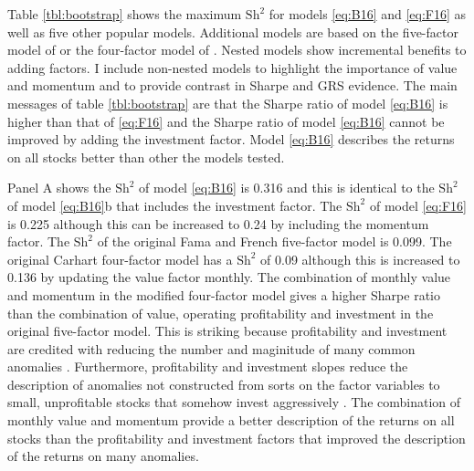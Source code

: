 

Table \ref{tbl:bootstrap} shows the maximum $\text{Sh}^2$ for models
\ref{eq:B16} and \ref{eq:F16} as well as five other popular models.
Additional models are based on the five-factor model of \textcite{fama2015five}
or the four-factor model of \textcite{carhart1997persistence}.
Nested models show incremental benefits to adding factors.
I include non-nested models to highlight the importance of value and momentum
and to provide contrast in Sharpe and GRS evidence.
The main messages of table \ref{tbl:bootstrap} are that the Sharpe ratio of
model \ref{eq:B16} is higher than that of \ref{eq:F16} and the Sharpe ratio of
model \ref{eq:B16} cannot be improved by adding the investment factor.
Model \ref{eq:B16} describes the returns on all stocks better than other the
models tested.

Panel A shows the $\text{Sh}^2$ of model \ref{eq:B16} is 0.316 and this
is identical to the $\text{Sh}^2$ of model \ref{eq:B16}b that includes
the investment factor.
The $\text{Sh}^2$ of model \ref{eq:F16} is 0.225 although this can be
increased to 0.24 by including the momentum factor.
The $\text{Sh}^2$ of the original Fama and French five-factor model is 0.099.
The original Carhart four-factor model has a $\text{Sh}^2$ of 0.09 although
this is increased to 0.136 by updating the value factor monthly.
The combination of monthly value and momentum in the modified four-factor
model gives a higher Sharpe ratio than the combination of value, operating
profitability and investment in the original five-factor model.
This is striking because profitability and investment are credited with
reducing the number and maginitude of many common anomalies
\parencite{fama2015five}.
Furthermore, profitability and investment slopes reduce the description of
anomalies not constructed from sorts on the factor variables to small,
unprofitable stocks that somehow invest aggressively
\parencite{fama2016dissecting}.
The combination of monthly value and momentum provide a better description of
the returns on all stocks than the profitability and investment factors that
improved the description of the returns on many anomalies.

